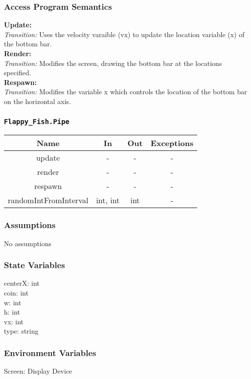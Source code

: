 \documentclass[11pt, oneside]{article}   	%
\begin{document}
\subsubsection*{Access Program Semantics} 
 \textbf{Update:}  \\
 \textit{Transition:} Uses the velocity varaible (vx) to update the location variable (x) of the bottom bar.\\
 \textbf{Render:}  \\
 \textit{Transition:} Modifies the screen, drawing the bottom bar at the locations specified.\\
 \textbf{Respawn:}  \\
 \textit{Transition:} Modifies the variable x which controls the location of the bottom bar on the horizontal axis.\\


\subsubsection*{\texttt{Flappy\_Fish.Pipe}}



\begin{center}
\begin{tabular}{ |c|c|c|c| } 
 \hline
 Name & In & Out & Exceptions \\ 
 \hline \hline
 update &-  & - & - \\ 
render & - & - & - \\ 
respawn & - & - & - \\ 
randomIntFromInterval & int, int & int & - \\
 \hline
\end{tabular}
\end{center}

\subsubsection*{Assumptions}
No assumptions

\subsubsection*{State Variables}
centerX: int\\
coin: int\\
w: int\\
h: int \\
vx: int \\
type: string\\
\subsubsection*{Environment Variables}
Screen: Display Device
\end{document}
